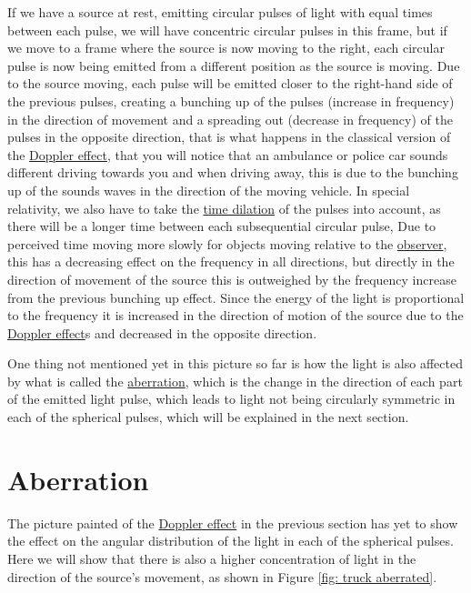 If we have a source at rest, emitting circular pulses of light with equal times between each pulse, we will have concentric circular pulses in this frame, but if we move to a frame where the source is now moving to the right, each circular pulse is now being emitted from a different position as the source is moving. Due to the source moving, each pulse will be emitted closer to the right-hand side of the previous pulses, creating a bunching up of the pulses (increase in frequency) in the direction of movement and a spreading out (decrease in frequency) of the pulses in the opposite direction, that is what happens in the classical version of the \hyperlink{def-doppler-effect}{Doppler effect}, that you will notice that an ambulance or police car sounds different driving towards you and when driving away, this is due to the bunching up of the sounds waves in the direction of the moving vehicle. In special relativity, we also have to take the \hyperlink{def-time-dilation}{time dilation} of the pulses into account, as there will be a longer time between each subsequential circular pulse, Due to perceived time moving more slowly for objects moving relative to the \hyperlink{def-observer}{observer}, this has a decreasing effect on the frequency in all directions, but directly in the direction of movement of the source this is outweighed by the frequency increase from the previous bunching up effect. Since the energy of the light is proportional to the frequency it is increased in the direction of motion of the source due to the \hyperlink{def-doppler-effect}{Doppler effect}s and decreased in the opposite direction.

One thing not mentioned yet in this picture so far is how the light is also affected by what is called the \hyperlink{def-aberration}{aberration}, which is the change in the direction of each part of the emitted light pulse, which leads to light not being circularly symmetric in each of the spherical pulses, which will be explained in the next section.

\section{Aberration}

The picture painted of the \hyperlink{def-doppler-effect}{Doppler effect} in the previous section has yet to show the effect on the angular distribution of the light in each of the spherical pulses. Here we will show that there is also a higher concentration of light in the direction of the source's movement, as shown in Figure \ref{fig: truck aberrated}.

